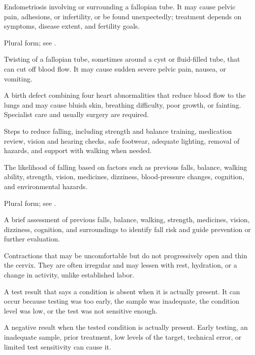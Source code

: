  Endometriosis involving or surrounding a fallopian tube. It may cause pelvic pain, adhesions, or infertility, or be found unexpectedly; treatment depends on symptoms, disease extent, and fertility goals.

 Plural form; see .

 Twisting of a fallopian tube, sometimes around a cyst or fluid-filled tube, that can cut off blood flow. It may cause sudden severe pelvic pain, nausea, or vomiting.

 A birth defect combining four heart abnormalities that reduce blood flow to the lungs and may cause bluish skin, breathing difficulty, poor growth, or fainting. Specialist care and usually surgery are required.

 Steps to reduce falling, including strength and balance training, medication review, vision and hearing checks, safe footwear, adequate lighting, removal of hazards, and support with walking when needed.

 The likelihood of falling based on factors such as previous falls, balance, walking ability, strength, vision, medicines, dizziness, blood-pressure changes, cognition, and environmental hazards.

 Plural form; see .

 A brief assessment of previous falls, balance, walking, strength, medicines, vision, dizziness, cognition, and surroundings to identify fall risk and guide prevention or further evaluation.

 Contractions that may be uncomfortable but do not progressively open and thin the cervix. They are often irregular and may lessen with rest, hydration, or a change in activity, unlike established labor.

 A test result that says a condition is absent when it is actually present. It can occur because testing was too early, the sample was inadequate, the condition level was low, or the test was not sensitive enough.

 A negative result when the tested condition is actually present. Early testing, an inadequate sample, prior treatment, low levels of the target, technical error, or limited test sensitivity can cause it.

